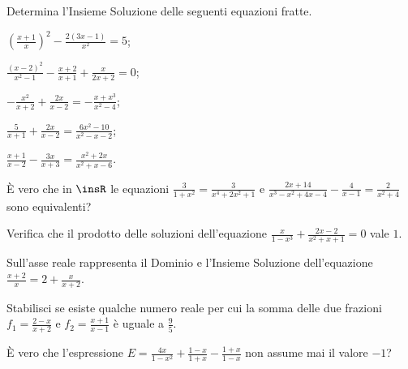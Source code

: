 \begin{esercizio}[\Ast]
 \label{ese:3.48}
Determina l'Insieme Soluzione delle seguenti equazioni fratte.
\begin{multicols}{2}
\begin{enumeratea}
\item $\left(\frac{x + 1}{x} \right)^{2}-\frac{2 (3 x-1)}{x^{2}} = 5$;
\item $\frac{(x-2)^{2}}{x^{2}-1}-\frac{x + 2}{x + 1} +\frac{x}{2 x + 2} = 0$;
\item $- \frac{x^{2}}{x + 2} + \frac{2 x}{x-2} =-\frac{x + x^{3}}{x^{2}-4}$;
\item $\frac{5}{x + 1} + \frac{2 x}{x-2} = \frac{6 x^{2}-10}{x^{2}-x-2}$;
\item $\frac{x + 1}{x-2}-\frac{3 x}{x + 3} = \frac{x^{2} + 2 x}{x^{2} + x-6}$.
\end{enumeratea}
\end{multicols}
\end{esercizio}

\begin{esercizio}[\Ast]
 \label{ese:3.49}
È vero che in $\insR$ le equazioni $\frac{3}{1 + x^{2}} = \frac{3}{x^{4} + 2 x^{2} + 1}$ e $\frac{2 x + 14}{x^{3}-x^{2} + 4 x-4}-\frac{4}{x-1} =\frac{2}{x^{2} + 4}$ sono equivalenti?
\end{esercizio}

\begin{esercizio}[\Ast]
 \label{ese:3.50}
Verifica che il prodotto delle soluzioni dell’equazione $\frac{x}{1-x^{3}} + \frac{2 x-2}{x^{2} + x + 1}=0$ vale $1$.
\end{esercizio}

\begin{esercizio}[\Ast]
 \label{ese:3.51}
Sull’asse reale rappresenta il Dominio e l’Insieme Soluzione dell’equazione $\frac{x + 2}{x}=2+\frac{x}{x + 2}$.
\end{esercizio}

\begin{esercizio}[\Ast]
 \label{ese:3.52}
Stabilisci se esiste qualche numero reale per cui la somma delle due frazioni $f_{1}=\frac{2-x}{x + 2}$ e $f_{2}=\frac{x + 1}{x-1}$ è uguale a $\frac{9}{5}$.
\end{esercizio}

\begin{esercizio}[\Ast]
 \label{ese:3.53}
È vero che l’espressione $E=\frac{4 x}{1-x^{2}} + \frac{1-x}{1 + x}-\frac{1 + x}{1-x}$ non assume mai il valore $-1$?
\end{esercizio}

